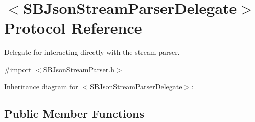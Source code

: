 \hypertarget{protocol_s_b_json_stream_parser_delegate-p}{
\section{$<$\-S\-B\-Json\-Stream\-Parser\-Delegate$>$ \-Protocol \-Reference}
\label{protocol_s_b_json_stream_parser_delegate-p}
}


\-Delegate for interacting directly with the stream parser.  




{\ttfamily \#import $<$\-S\-B\-Json\-Stream\-Parser.\-h$>$}



\-Inheritance diagram for $<$\-S\-B\-Json\-Stream\-Parser\-Delegate$>$\-:
\subsection*{\-Public \-Member \-Functions}

